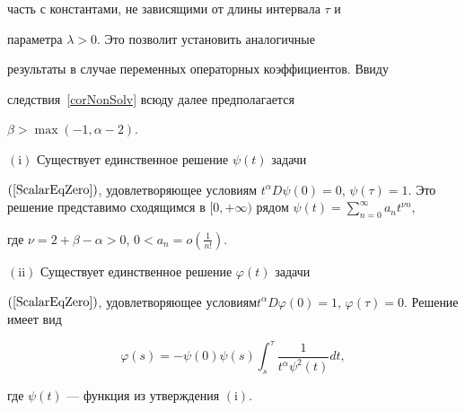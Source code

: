 часть с константами, не зависящими от длины интервала $\tau$ и


параметра $\lambda >0$. Это позволит установить аналогичные


результаты в случае переменных операторных коэффициентов. Ввиду


следствия~\ref{corNonSolv} всюду далее предполагается


$\beta> \max(-1, \alpha-2)$.








\begin{thms}\label{FnGreen}


$(\mathrm i)$ Существует единственное решение $\psi(t)$ задачи


$(\ref{ScalarEqZero})$, удовлетворяющее условиям $t^\alpha D\psi


(0)=0$, $\psi(\tau)=1$. Это решение представимо сходящимся в $[0,


+\infty)$ рядом $ \psi(t)=\sum\limits_{n=0}^\infty a_nt^{\nu n}$,


где  $\nu=2+\beta-\alpha>0$, $0 < a_n=o(\frac{1}{n!})$.





$(\mathrm{ii})$ Существует единственное решение $\varphi(t)$ задачи


$(\ref{ScalarEqZero})$, удовлетворяющее условиям\linebreak $t^\alpha D\varphi


(0)=1$, $\varphi(\tau)=0$. Решение имеет вид


$$


\varphi(s)=-\psi(0)\psi(s)\int_s^\tau \frac{1}{t^\alpha


\psi^2(t)} dt,


$$


где $\psi(t)$ --- функция из утверждения $(\mathrm i)$.


\end{thms}











